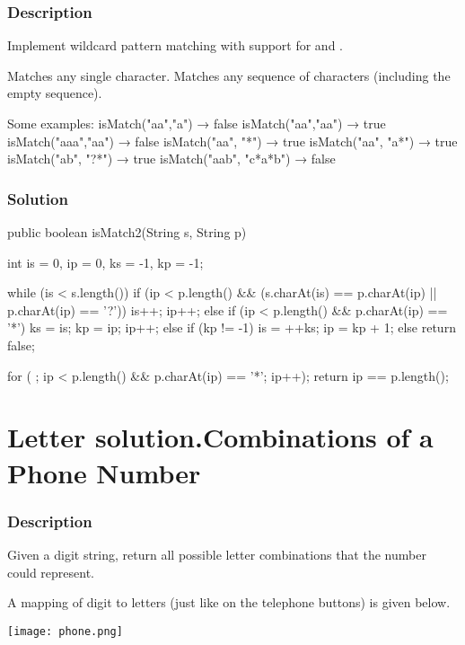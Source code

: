 \subsubsection{Description}
Implement wildcard pattern matching with support for  and .

 Matches any single character.
 Matches any sequence of characters (including the empty sequence).

\begin{Code}
Some examples:
isMatch("aa","a") → false
isMatch("aa","aa") → true
isMatch("aaa","aa") → false
isMatch("aa", "*") → true
isMatch("aa", "a*") → true
isMatch("ab", "?*") → true
isMatch("aab", "c*a*b") → false
\end{Code}

\subsubsection{Solution}
\begin{Code}
public boolean isMatch2(String s, String p) {
    int is = 0, ip = 0, ks = -1, kp = -1;

    while (is < s.length()) {
        if (ip < p.length() && (s.charAt(is) == p.charAt(ip) || p.charAt(ip) == '?')) {
            is++;
            ip++;
        } else if (ip < p.length() && p.charAt(ip) == '*') {
            ks = is;
            kp = ip;
            ip++;
        } else if (kp != -1) {
            is = ++ks;
            ip = kp + 1;
        } else {
            return false;
        }
    }

    for ( ; ip < p.length() && p.charAt(ip) == '*'; ip++);
    return ip == p.length();
}
\end{Code}

\newpage

\section{Letter solution.Combinations of a Phone Number} %

\subsubsection{Description}
Given a digit string, return all possible letter combinations that the number could represent.

A mapping of digit to letters (just like on the telephone buttons) is given below.

\begin{center}
\texttt{[image: phone.png]}\\
\label{fig:phone-keyboard}
\end{center}

